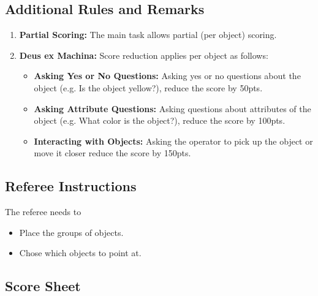 \subsection*{Additional Rules and Remarks}
\begin{enumerate}[nosep]
	\item \textbf{Partial Scoring:} The main task allows partial (per object) scoring.
	
	\item \textbf{Deus ex Machina:} Score reduction applies per object as follows:
	\begin{itemize}[nosep]
		\item \textbf{Asking Yes or No Questions:} Asking yes or no questions about the object (e.g. Is the object yellow?), reduce the score by 50pts.
		\item \textbf{Asking Attribute Questions:} Asking questions about attributes of the object (e.g. What color is the object?), reduce the score by 100pts.
		\item \textbf{Interacting with Objects:} Asking the operator to pick up the object or move it closer reduce the score by 150pts.
	\end{itemize}
\end{enumerate}

\newpage

\subsection*{Referee Instructions}

The referee needs to
\begin{itemize}[nosep]
	\item Place the groups of objects.
	\item Chose which objects to point at.
\end{itemize}

\subsection*{Score Sheet}


